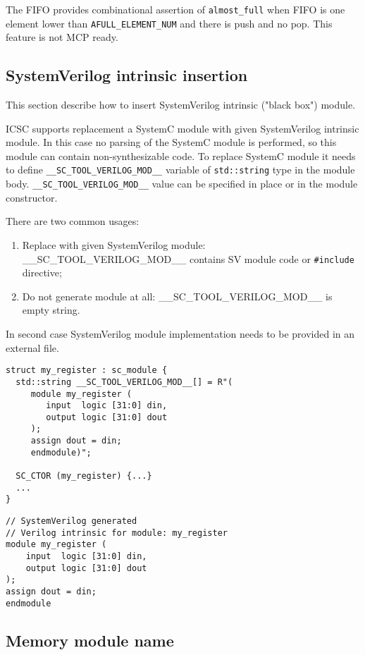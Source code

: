 The FIFO provides combinational assertion of {\tt almost\_full} when FIFO is one element lower than {\tt AFULL\_ELEMENT\_NUM} and there is push and no pop. This feature is not MCP ready.


\subsection{SystemVerilog intrinsic insertion}\label{section:black_box}

This section describe how to insert SystemVerilog intrinsic ("black box") module.

ICSC supports replacement a SystemC module with given SystemVerilog intrinsic module. In this case no parsing of the SystemC module is performed, so this module can contain non-synthesizable code. To replace SystemC module it needs to define {\tt \_\_SC\_TOOL\_VERILOG\_MOD\_\_} variable of {\tt std::string} type in the module body.
{\tt \_\_SC\_TOOL\_VERILOG\_MOD\_\_} value can be specified in place or in the module constructor.

There are two common usages:
\begin{enumerate}
\item Replace with given SystemVerilog module: \_\_SC\_TOOL\_VERILOG\_MOD\_\_ contains SV module code or {\tt \#include} directive;
\item Do not generate module at all: \_\_SC\_TOOL\_VERILOG\_MOD\_\_ is empty string. 
\end{enumerate}
%
In second case SystemVerilog module implementation needs to be provided in an external file.

\begin{lstlisting}[style=mycpp]
struct my_register : sc_module {
  std::string __SC_TOOL_VERILOG_MOD__[] = R"(
     module my_register (
        input  logic [31:0] din,
        output logic [31:0] dout
     );
     assign dout = din;
     endmodule)";

  SC_CTOR (my_register) {...}
  ...
}
\end{lstlisting}
%
\begin{lstlisting}[style=mycpp]
// SystemVerilog generated
// Verilog intrinsic for module: my_register 
module my_register (
    input  logic [31:0] din,
    output logic [31:0] dout
);
assign dout = din;
endmodule
\end{lstlisting}



\subsection{Memory module name}

